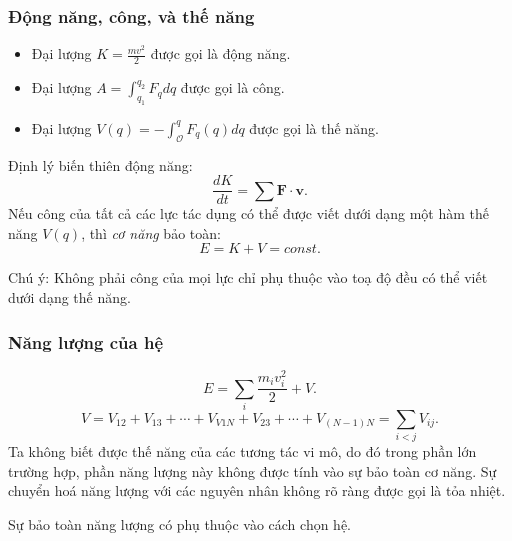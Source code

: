 \begin{frame}
    \frametitle{Động năng, công, và thế năng}
    \begin{itemize}
        \item Đại lượng \(K=\frac{mv^2}{2}\) được gọi là động năng.
        \item Đại lượng \(A=\int_{q_1}^{q_2}F_q dq\) được gọi là công.
        \item Đại lượng \(V(q)=-\int_{\mathcal{O}}^{q}F_q(q)dq\) được gọi là thế năng.
    \end{itemize}
    Định lý biến thiên động năng: \[\frac{dK}{dt}=\sum \mathbf{F}\cdot\mathbf{v}.\]
    Nếu công của tất cả các lực tác dụng có thể được viết dưới dạng một hàm thế năng \(V(q)\), thì \emph{cơ năng} bảo toàn:
    \[E=K+V=const.\]
    \vspace{-16pt}

    Chú ý: Không phải công của mọi lực chỉ phụ thuộc vào toạ độ đều có thể viết dưới dạng thế năng.
\end{frame}
\begin{frame}
\frametitle{Năng lượng của hệ}
\[E=\sum_{i}\frac{m_i v_{i}^2}{2}+V.\]
\[V=V_{12}+V_{13}+\cdots +V_{V1N}+V_{23}+\cdots +V_{(N-1)N}=\sum_{i<j} V_{ij}.\]
Ta không biết được thế năng của các tương tác vi mô, do đó trong phần lớn trường hợp, phần năng lượng này không được tính vào sự bảo toàn cơ năng. Sự chuyển hoá năng lượng với các nguyên nhân không rõ ràng được gọi là tỏa nhiệt.
\vspace{8pt}

Sự bảo toàn năng lượng có phụ thuộc vào cách chọn hệ.
\end{frame}